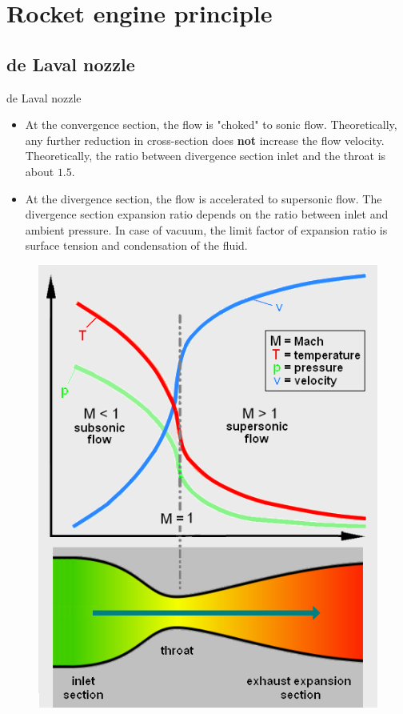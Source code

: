 \documentclass{beamer}
\begin{document}
\section{Rocket engine principle}

\subsection{de Laval nozzle}
\begin{frame}[t]{de Laval nozzle}
    \noindent
    \begin{minipage}[t]{0.55\textwidth}
        \vspace{-10pt}
        \begin{itemize}
            \item At the convergence section, the flow is "choked" to sonic flow. Theoretically, any further reduction in cross-section does \textbf{not} increase the flow velocity. Theoretically, the ratio between divergence section inlet and the throat is about $1.5$. 
            \item At the divergence section, the flow is accelerated to supersonic flow. The divergence section expansion ratio depends on the ratio between inlet and ambient pressure. In case of vacuum, the limit factor of expansion ratio is surface tension and condensation of the fluid.
        \end{itemize}
    \end{minipage}%
    \hfill
    \begin{minipage}[t]{0.45\textwidth}
        \vspace{-5pt}
        \begin{figure}[t]
            \centering
            \includegraphics[height=0.65\textheight]{images/De_Laval_nozzle.png}

\end{figure}
\end{minipage}
\end{frame}
\end{document}
